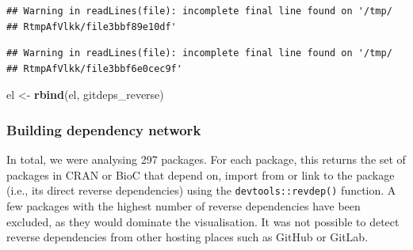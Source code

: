 \documentclass[]{article}
\newenvironment{Shaded}{\begin{snugshade}}{\end{snugshade}}
\newcommand{\DataTypeTok}[1]{\textcolor[rgb]{0.13,0.29,0.53}{#1}}
\newcommand{\KeywordTok}[1]{\textcolor[rgb]{0.13,0.29,0.53}{\textbf{#1}}}
\newcommand{\NormalTok}[1]{#1}
\newcommand{\OperatorTok}[1]{\textcolor[rgb]{0.81,0.36,0.00}{\textbf{#1}}}
\newcommand{\StringTok}[1]{\textcolor[rgb]{0.31,0.60,0.02}{#1}}
\begin{document}
\begin{Shaded}
\end{Shaded}

\begin{verbatim}
## Warning in readLines(file): incomplete final line found on '/tmp/
## RtmpAfVlkk/file3bbf89e10df'
\end{verbatim}

\begin{verbatim}
## Warning in readLines(file): incomplete final line found on '/tmp/
## RtmpAfVlkk/file3bbf6e0cec9f'
\end{verbatim}

\begin{Shaded}
\begin{Highlighting}[]
\NormalTok{el <-}\StringTok{ }\KeywordTok{rbind}\NormalTok{(el, gitdeps_reverse)}
\end{Highlighting}
\end{Shaded}

\hypertarget{building-dependency-network}{%
\subsubsection*{Building dependency network}\label{building-dependency-network}}

In total, we were analysing 297 packages.
For each package, this returns the set of packages in CRAN or BioC that depend on, import from or link to the package (i.e., its direct reverse dependencies) using the \texttt{devtools::revdep()} function. A few packages with the highest number of reverse dependencies have been excluded, as they would dominate the visualisation.
It was not possible to detect reverse dependencies from other hosting places such as GitHub or GitLab.
\end{document}
